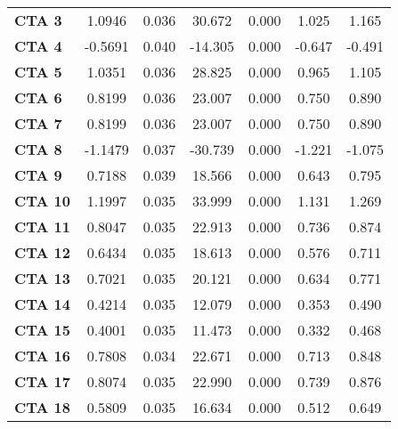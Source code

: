 \documentclass{article}
\begin{document}
\begin{center}
\begin{tabular}{lcccccc}
\textbf{CTA 3}   &       1.0946  &        0.036     &    30.672  &         0.000        &        1.025    &        1.165     \\
\textbf{CTA 4}   &      -0.5691  &        0.040     &   -14.305  &         0.000        &       -0.647    &       -0.491     \\
\textbf{CTA 5}   &       1.0351  &        0.036     &    28.825  &         0.000        &        0.965    &        1.105     \\
\textbf{CTA 6}   &       0.8199  &        0.036     &    23.007  &         0.000        &        0.750    &        0.890     \\
\textbf{CTA 7}   &       0.8199  &        0.036     &    23.007  &         0.000        &        0.750    &        0.890     \\
\textbf{CTA 8}   &      -1.1479  &        0.037     &   -30.739  &         0.000        &       -1.221    &       -1.075     \\
\textbf{CTA 9}   &       0.7188  &        0.039     &    18.566  &         0.000        &        0.643    &        0.795     \\
\textbf{CTA 10}   &       1.1997  &        0.035     &    33.999  &         0.000        &        1.131    &        1.269     \\
\textbf{CTA 11}   &       0.8047  &        0.035     &    22.913  &         0.000        &        0.736    &        0.874     \\
\textbf{CTA 12}   &       0.6434  &        0.035     &    18.613  &         0.000        &        0.576    &        0.711     \\
\textbf{CTA 13}   &       0.7021  &        0.035     &    20.121  &         0.000        &        0.634    &        0.771     \\
\textbf{CTA 14}   &       0.4214  &        0.035     &    12.079  &         0.000        &        0.353    &        0.490     \\
\textbf{CTA 15}   &       0.4001  &        0.035     &    11.473  &         0.000        &        0.332    &        0.468     \\
\textbf{CTA 16}   &       0.7808  &        0.034     &    22.671  &         0.000        &        0.713    &        0.848     \\
\textbf{CTA 17}   &       0.8074  &        0.035     &    22.990  &         0.000        &        0.739    &        0.876     \\
\textbf{CTA 18}   &       0.5809  &        0.035     &    16.634  &         0.000        &        0.512    &        0.649     \\

\end{tabular}
\end{center}
\end{document}
